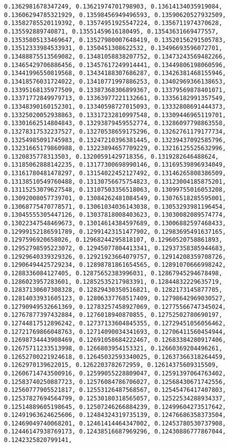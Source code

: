 \documentclass[11pt]{article}
\begin{document}
\begin{Verbatim}[commandchars=\\\{\}]
0.1362981678347249, 0.13621974701798903, 0.13614134035919084, 0.13606294785321929, 0.13598456949496593, 0.13590620527932509, 0.13582785520119392, 0.13574951925547224, 0.1356711974370628, 0.135592889740871, 0.13551459616180495, 0.13543631669477557, 0.13535805133469647, 0.13527980007648419, 0.13520156291505783, 0.13512333984533931, 0.1350451308622532, 0.13496693596072701, 0.13488875513569082, 0.13481058838207752, 0.13473243569482266, 0.13465429706886456, 0.13457617249914441, 0.13449806198060596, 0.13441996550819568, 0.13434188307686287, 0.13426381468155946, 0.13418576031724022, 0.13410771997886253, 0.13402969366138653, 0.13395168135977509, 0.13387368306899367, 0.13379569878401071, 0.13371772849979713, 0.13363977221132661, 0.13356182991357549, 0.13348390160152301, 0.13340598727015093, 0.13332808691444373, 0.13325020052938863, 0.13317232810997548, 0.13309446965119701, 0.13301662514804843, 0.13293879459552774, 0.13286097798863558, 0.13278317532237527, 0.13270538659175296, 0.13262761179177734, 0.13254985091745983, 0.13247210396381445, 0.13239437092585796, 0.13231665179860988, 0.13223894657709229, 0.13216125525632996, 0.1320835778313503, 0.13200591429718356, 0.1319282646488624, 0.13185062888142235, 0.13177300698990146, 0.13169539896934049, 0.13161780481478297, 0.13154022452127492, 0.13146265808386509, 0.13138510549760488, 0.13130756675754823, 0.13123004185875201, 0.13115253079627548, 0.13107503356518063, 0.13099755016053208, 0.13092008057739701, 0.13084262481084549, 0.13076518285595001, 0.13068775470778571, 0.13061034036143038, 0.13053293981196454, 0.13045555305447126, 0.13037818008403623, 0.13030082089574774, 0.13022347548469673, 0.13014614384597689, 0.13006882597468433, 0.12999152186591789, 0.12991423151477902, 0.12983695491637165, 0.1297596920658026, 0.12968244295818107, 0.12960520758861893, 0.12952798595223072, 0.12945077804413341, 0.12937358385944683, 0.12929640339329326, 0.12921923664079757, 0.12914208359708726, 0.12906494425729234, 0.12898781861654565, 0.12891070666998242, 0.1288336084127405, 0.12875652383996031, 0.12867945294678498, 0.1286023957283601, 0.12852535217983391, 0.12844832229635719, 0.12837130607308328, 0.12829430350516821, 0.1282173145877705, 0.12814033931605123, 0.12806337768517409, 0.12798642969030527, 0.12790949532661369, 0.12783257458927069, 0.12775566747345024, 0.12767877397432884, 0.1276018940870855, 0.12752502780690197, 0.12744817512896242, 0.12737133604845355, 0.12729451056056462, 0.12721769866048763, 0.12714090034341693, 0.12706411560454944, 0.12698734443908469, 0.12691058684222467, 0.12683384280917406, 0.12675711233513998, 0.1266803954153321, 0.12660369204496261, 0.12652700221924618, 0.12645032593340025, 0.12637366318264459, 0.1262970139622015, 0.1262203782672959, 0.12614375609315509, 0.12606714743500916, 0.12599055228809047, 0.12591397064763402, 0.12583740250887723, 0.12576084786706027, 0.12568430671742556, 0.12560777905521817, 0.12553126487568567, 0.12545476417407803, 0.12537827694564799, 0.12530180318565057, 0.12522534288934337, 0.12514889605198645, 0.12507246266884239, 0.12499604273517642, 0.12491963624625606, 0.12484324319735139, 0.12476686358373504, 0.12469049740068201, 0.12461414464347002, 0.12453780530737908, 0.12446147938769173, 0.12438516687969296, 0.12430886777867044, 0.1242325820799141, 
\end{Verbatim}
\end{document}
